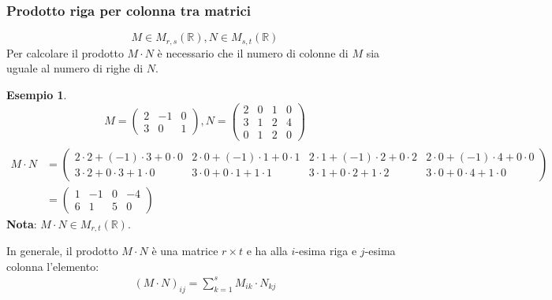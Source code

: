 \documentclass[a4paper]{article}
\theoremstyle{definition}
\newtheorem*{es}{Esempio}
\begin{document}
\subsubsection{Prodotto riga per colonna tra matrici}
\[ M \in M_{r, s}(\mathbb{R}), N \in M_{s, t}(\mathbb{R}) \]
Per calcolare il prodotto $M \cdot N$ è necessario che il numero di colonne di $M$ sia uguale al numero di righe di $N$.
\begin{es}
	\[ M = \begin{pmatrix}
		2 & -1 & 0 \\
		3 & 0 & 1
	\end{pmatrix}, N = \begin{pmatrix}
		2 & 0 & 1 & 0 \\
		3 & 1 & 2 & 4 \\
		0 & 1 & 2 & 0
	\end{pmatrix} \]
	\begin{align*}
		 \\
		M \cdot N &= \begin{pmatrix}
			2 \cdot 2 + (-1) \cdot 3 + 0 \cdot 0 & 2 \cdot 0 + (-1) \cdot 1 + 0 \cdot 1 & 2 \cdot 1 + (-1) \cdot 2 + 0 \cdot 2 & 2 \cdot 0 + (-1) \cdot 4 + 0 \cdot 0 \\
			3 \cdot 2 + 0 \cdot 3 + 1 \cdot 0 & 3 \cdot 0 + 0 \cdot 1 + 1 \cdot 1 & 3 \cdot 1 + 0 \cdot 2 + 1 \cdot 2 & 3 \cdot 0 + 0 \cdot 4 + 1 \cdot 0
		\end{pmatrix} \\
			&= \begin{pmatrix}
			1 & -1 & 0 & -4 \\
			6 & 1 & 5 & 0
		\end{pmatrix}
	\end{align*}
	\textbf{Nota}: $M \cdot N \in M_{r, t}(\mathbb{R})$.
\end{es}
In generale, il prodotto $M \cdot N$ è una matrice $r \times t$ e ha alla $i$-esima riga e $j$-esima colonna l'elemento:
\begin{align*}
	(M \cdot N)_{ij} = \sum_{k=1}^{s} M_{ik} \cdot N_{kj}
\end{align*}
\end{document}
